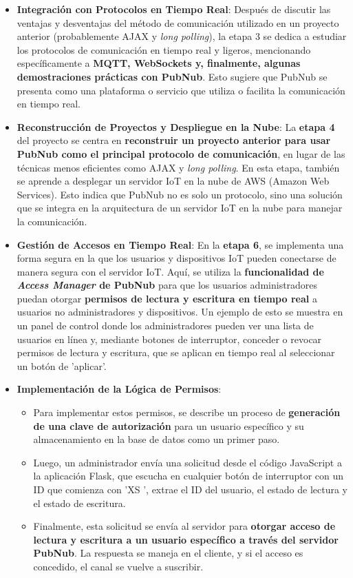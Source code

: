 \documentclass{report}
\begin{document}
\begin{itemize}
    \item \textbf{Integración con Protocolos en Tiempo Real}: Después de discutir las ventajas y desventajas del método de comunicación utilizado en un 
    proyecto anterior (probablemente AJAX y \textit{long polling}), la etapa 3 se dedica a estudiar los protocolos de comunicación en tiempo real y ligeros, 
    mencionando específicamente a \textbf{MQTT, WebSockets y, finalmente, algunas demostraciones prácticas con PubNub}. Esto sugiere que PubNub se presenta 
    como una plataforma o servicio que utiliza o facilita la comunicación en tiempo real.

    \item \textbf{Reconstrucción de Proyectos y Despliegue en la Nube}: La \textbf{etapa 4} del proyecto se centra en \textbf{reconstruir un proyecto 
    anterior para usar PubNub como el principal protocolo de comunicación}, en lugar de las técnicas menos eficientes como AJAX y \textit{long polling}. 
    En esta etapa, también se aprende a desplegar un servidor IoT en la nube de AWS (Amazon Web Services). Esto indica que PubNub no es solo un 
    protocolo, sino una solución que se integra en la arquitectura de un servidor IoT en la nube para manejar la comunicación.

    \item \textbf{Gestión de Accesos en Tiempo Real}: En la \textbf{etapa 6}, se implementa una forma segura en la que los usuarios y dispositivos IoT 
    pueden conectarse de manera segura con el servidor IoT. Aquí, se utiliza la \textbf{funcionalidad de \textit{Access Manager} de PubNub} para que los 
    usuarios administradores puedan otorgar \textbf{permisos de lectura y escritura en tiempo real} a usuarios no administradores y dispositivos. 
    Un ejemplo de esto se muestra en un panel de control donde los administradores pueden ver una lista de usuarios en línea y, mediante botones de 
    interruptor, conceder o revocar permisos de lectura y escritura, que se aplican en tiempo real al seleccionar un botón de  'aplicar'.

    \item \textbf{Implementación de la Lógica de Permisos}:
    \begin{itemize}
        \item Para implementar estos permisos, se describe un proceso de \textbf{generación de una clave de autorización} para un usuario específico y 
        su almacenamiento en la base de datos como un primer paso.
        \item Luego, un administrador envía una solicitud desde el código JavaScript a la aplicación Flask, que escucha en cualquier botón de interruptor 
        con un ID que comienza con  'XS ', extrae el ID del usuario, el estado de lectura y el estado de escritura.
        \item Finalmente, esta solicitud se envía al servidor para \textbf{otorgar acceso de lectura y escritura a un usuario específico a través del 
        servidor PubNub}. La respuesta se maneja en el cliente, y si el acceso es concedido, el canal se vuelve a suscribir.
    \end{itemize}
\end{itemize}
\end{document}
